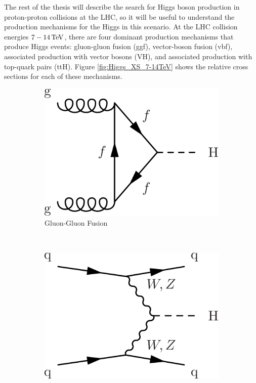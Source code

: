 \par The rest of the thesis will describe the search for Higgs
boson production in proton-proton collisions at the LHC, so it will be
useful to understand the production mechanisms for the Higgs in this
scenario.  At the LHC collision energies $7-14\,\text{Te\hspace{-.08em}V}$, there are four
dominant production mechanisms that produce Higgs events: gluon-gluon
fusion (ggf), vector-boson fusion (vbf), associated production with
vector bosons (VH), and associated production with top-quark pairs (ttH).  Figure
\ref{fig:Higgs_XS_7-14TeV} shows the relative cross sections for each
of these mechanisms.  

\begin{figure}
    \centering
    \begin{subfigure}[b]{0.3\textwidth}
        \label{fig:higgs_production_ggf}
        \includegraphics[width=\textwidth]{Figures/Feynman_Diagrams/higgs_production__ggf.pdf}
        \caption{Gluon-Gluon Fusion}
      \end{subfigure}
      ~ %
      \begin{subfigure}[b]{0.3\textwidth}
        \label{fig:higgs_production_ggf}
        \includegraphics[width=\textwidth]{Figures/Feynman_Diagrams/higgs_production__vbf.pdf}

\end{subfigure}
\end{figure}
